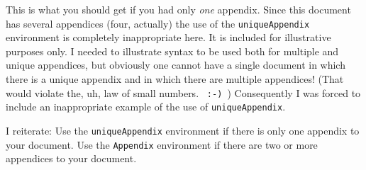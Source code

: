 \documentclass[times, doublespace]{anzsauth}
\begin{document}
\begin{uniqueAppendix}
This is what you should get if you had only \emph{one} appendix.
Since this document has several appendices (four, actually) the
use of the \texttt{uniqueAppendix} environment is completely
inappropriate here.  It is included for illustrative purposes
only.  I needed to illustrate syntax to be used both for multiple
and unique appendices, but obviously one cannot have a single
document in which there is a unique appendix and in which there are
multiple appendices!  (That would violate the, uh, law of small
numbers. \verb! :-) !)  Consequently I was forced to include an
inappropriate example of the use of \texttt{uniqueAppendix}.

I reiterate:  Use the \texttt{uniqueAppendix} environment if there is
only one appendix to your document.  Use the \texttt{Appendix}
environment if there are two or more appendices to your document.
\end{uniqueAppendix}


\newpage


\end{document}
